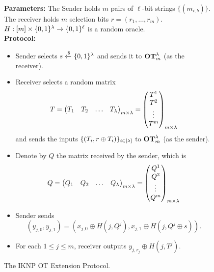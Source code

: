 \begin{figure}[h]
	\begin{mdframed}[
		linecolor=black,
		linewidth=1pt,
		roundcorner=5pt,
		backgroundcolor=white,
		userdefinedwidth=\textwidth,
		]
		\vspace{2mm}
		\textbf{Parameters:} The Sender holds $m$ pairs of $\ell$-bit strings $\{(m_{i,b})\}$. The receiver holds $m$ selection bits $r=(r_1,\dots, r_m)$. $H:[m]\times\{0,1\}^{\lambda}\rightarrow\{0,1\}^\ell$ is a random oracle.\\

		\textbf{Protocol:}		 
		\begin{itemize}
			\item Sender selects $s\xleftarrow{\$}\{0,1\}^\lambda$ and sends it to $\mathbf{OT}^{\lambda}_{m}$ (as the receiver).
			\item Receiver selects a random matrix
			$$T=
			\begin{pmatrix}
				T_1 & T_2 & \hdots & T_\lambda
			\end{pmatrix}_{m\times \lambda}=\begin{pmatrix}
			T^1 \\ T^2 \\ \vdots \\ T^m
		\end{pmatrix}_{m\times \lambda}$$ and sends the inputs $\{(T_i, r\oplus T_i)\}_{i\in[\lambda]}$ to $\mathbf{OT}^{\lambda}_{m}$ (as the sender).
			\item Denote by $Q$ the matrix received by the sender, which is
			$$Q=
			\begin{pmatrix}
				Q_1 & Q_2 & \hdots & Q_\lambda
			\end{pmatrix}_{m\times \lambda} = \begin{pmatrix}
			Q^1 \\ Q^2 \\ \vdots \\ Q^m
		\end{pmatrix}_{m\times \lambda}$$
		\item Sender sends 
		$$(y_{j,0}, y_{j,1})=(x_{j,0}\oplus H(j,Q^j), x_{j,1}\oplus H(j, Q^j\oplus s)).$$
		\item For each $1\leq j\leq m$, receiver outputs $y_{j, r_j}\oplus H(j, T^j)$.
		\end{itemize}
		\vspace{2mm}
	\end{mdframed}
	\caption{The IKNP OT Extension Protocol.}
	\label{fig:IKNP}
\end{figure}

